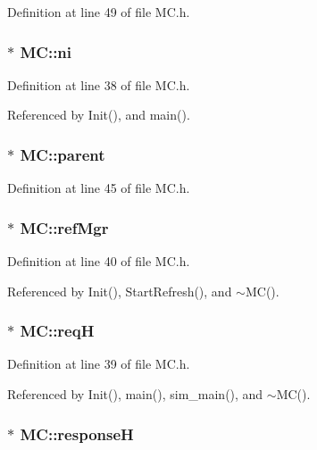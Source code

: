Definition at line 49 of file MC.h.
\subsubsection[{ni}]{$\ast$ {\bf MC::ni}}\label{classMC_b91265d7b3e979122d20de7abfc6d854}




Definition at line 38 of file MC.h.

Referenced by Init(), and main().
\subsubsection[{parent}]{$\ast$ {\bf MC::parent}}\label{classMC_bf2f57e15f676b20c0b0e9eb6b1880fe}




Definition at line 45 of file MC.h.
\subsubsection[{refMgr}]{$\ast$ {\bf MC::refMgr}}\label{classMC_e273df8dc1334a025db110d21ba90bca}




Definition at line 40 of file MC.h.

Referenced by Init(), StartRefresh(), and $\sim$MC().
\subsubsection[{reqH}]{$\ast$ {\bf MC::reqH}}\label{classMC_95b5a37c33fa8a000ec0969abdde0118}




Definition at line 39 of file MC.h.

Referenced by Init(), main(), sim\_\-main(), and $\sim$MC().
\subsubsection[{responseH}]{$\ast$ {\bf MC::responseH}}\label{classMC_ce4c1e78e98a11a6f1f64284e89832e9}




